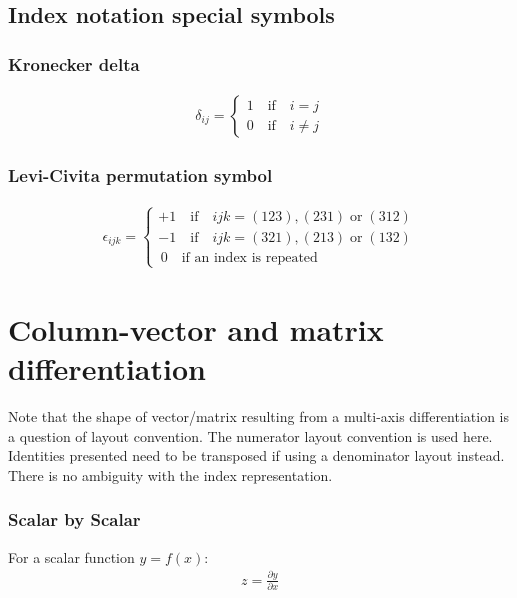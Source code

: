 \subsection{Index notation special symbols}

\subsubsection{ Kronecker delta }
\begin{align}
\delta_{ij} = \left\lbrace \begin{array}{c}
1 \quad\text{if}\quad i=j\\
0 \quad\text{if}\quad i\neq j
\end{array}
\right.
\end{align}


\subsubsection{ Levi-Civita permutation symbol }
\begin{align}
\epsilon_{ijk} = \left\lbrace \begin{array}{l}
+1  \quad\text{if}\quad ijk=(123),(231) \;\text{or}\; (312)\\
-1   \quad\text{if}\quad ijk=(321),(213) \;\text{or}\; (132)\\
\,0  \quad\text{if an index is repeated}
\end{array}
\right.
\end{align}



\section{Column-vector and matrix differentiation}
\label{sec:vecmatdifferentiation}

Note that the shape of vector/matrix resulting from a multi-axis differentiation is a question of layout convention. The numerator layout convention is used here. Identities presented need to be transposed if using a denominator layout instead. There is no ambiguity with the index representation.

\subsubsection{Scalar by Scalar}

For a scalar function $y = f(x)$: 
\begin{align}
z = \frac{\partial y}{\partial x}
\end{align}


